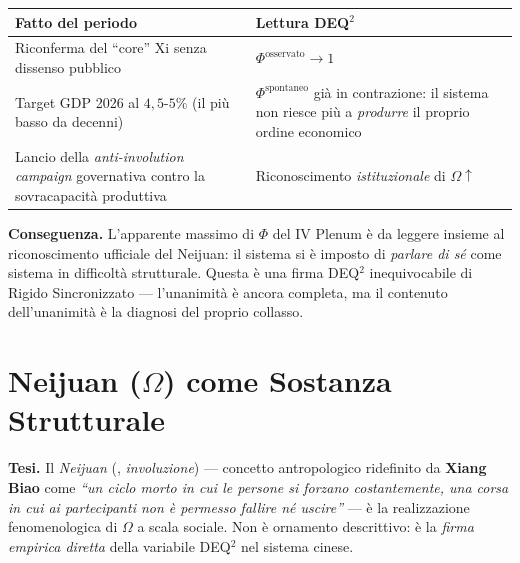 {\def\LTcaptype{none} %
{\small\begin{longtable}[]{@{}
  >{\raggedright\arraybackslash}p{}
  >{\raggedright\arraybackslash}p{}@{}}
\toprule\noalign{}
\begin{minipage}[b]{\linewidth}\raggedright
Fatto del periodo
\end{minipage} & \begin{minipage}[b]{\linewidth}\raggedright
Lettura DEQ$^2$
\end{minipage} \\
\midrule\noalign{}
\endhead
\bottomrule\noalign{}
\endlastfoot
Riconferma del ``core'' Xi senza dissenso pubblico &
\(\Phi^{\text{osservato}} \to 1\) \\
Target GDP 2026 al \(4{,}5\)-\(5\%\) (il più basso da decenni) &
\(\Phi^{\text{spontaneo}}\) già in contrazione: il sistema non riesce
più a \emph{produrre} il proprio ordine economico \\
Lancio della \emph{anti-involution campaign} governativa contro la
sovracapacità produttiva & Riconoscimento \emph{istituzionale} di
\(\Omega \uparrow\) \\
\end{longtable}}
}

\Proved{} \textbf{Conseguenza.} L'apparente massimo di \(\Phi\) del IV
Plenum è da leggere insieme al riconoscimento ufficiale del Neijuan: il
sistema si è imposto di \emph{parlare di sé} come sistema in difficoltà
strutturale. Questa è una firma DEQ$^2$ inequivocabile di Rigido
Sincronizzato --- l'unanimità è ancora completa, ma il contenuto
dell'unanimità è la diagnosi del proprio collasso.



\section{\texorpdfstring{Neijuan (\(\Omega\)) come Sostanza
Strutturale}{Neijuan (\textbackslash Omega) come Sostanza Strutturale}}\label{neijuan-omega-come-sostanza-strutturale}

\Hypoth{} \textbf{Tesi.} Il \emph{Neijuan} (, \emph{involuzione}) ---
concetto antropologico ridefinito da \textbf{Xiang Biao} come \emph{``un
ciclo morto in cui le persone si forzano costantemente, una corsa in cui
ai partecipanti non è permesso fallire né uscire''} --- è la
realizzazione fenomenologica di \(\Omega\) a scala sociale. Non è
ornamento descrittivo: è la \emph{firma empirica diretta} della
variabile DEQ$^2$ nel sistema cinese.

